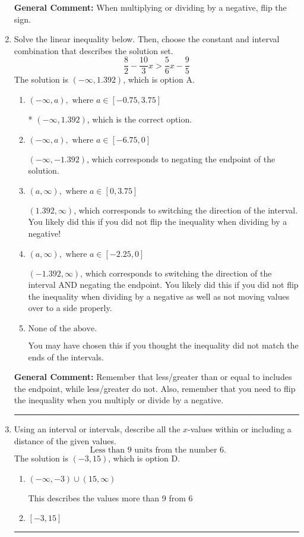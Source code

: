 \documentclass{extbook}[14pt]
\newcommand{\litem}[1]{\item #1

\rule{\textwidth}{0.4pt}}
\begin{document}
\begin{enumerate}
{\textbf{General Comment:} When multiplying or dividing by a negative, flip the sign.
}
\litem{
Solve the linear inequality below. Then, choose the constant and interval combination that describes the solution set.
\[ \frac{8}{2} - \frac{10}{3} x > \frac{5}{6} x - \frac{9}{5} \]The solution is \( (-\infty, 1.392) \), which is option A.\begin{enumerate}[label=\Alph*.]
\item \( (-\infty, a), \text{ where } a \in [-0.75, 3.75] \)

* $(-\infty, 1.392)$, which is the correct option.
\item \( (-\infty, a), \text{ where } a \in [-6.75, 0] \)

 $(-\infty, -1.392)$, which corresponds to negating the endpoint of the solution.
\item \( (a, \infty), \text{ where } a \in [0, 3.75] \)

 $(1.392, \infty)$, which corresponds to switching the direction of the interval. You likely did this if you did not flip the inequality when dividing by a negative!
\item \( (a, \infty), \text{ where } a \in [-2.25, 0] \)

 $(-1.392, \infty)$, which corresponds to switching the direction of the interval AND negating the endpoint. You likely did this if you did not flip the inequality when dividing by a negative as well as not moving values over to a side properly.
\item \( \text{None of the above}. \)

You may have chosen this if you thought the inequality did not match the ends of the intervals.
\end{enumerate}

\textbf{General Comment:} Remember that less/greater than or equal to includes the endpoint, while less/greater do not. Also, remember that you need to flip the inequality when you multiply or divide by a negative.
}
\litem{
Using an interval or intervals, describe all the $x$-values within or including a distance of the given values.
\[ \text{ Less than } 9 \text{ units from the number } 6. \]The solution is \( (-3, 15) \), which is option D.\begin{enumerate}[label=\Alph*.]
\item \( (-\infty, -3) \cup (15, \infty) \)

This describes the values more than 9 from 6
\item \( [-3, 15] \)


\end{enumerate}}
\end{enumerate}
\end{document}
